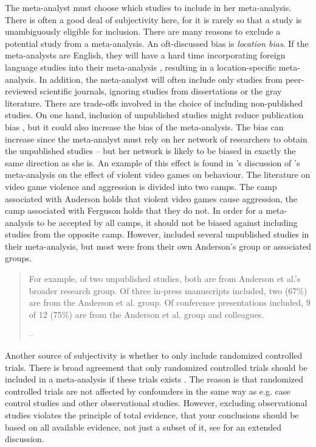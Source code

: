 The meta-analyst must choose which studies to include in her meta-analysis. There is often a good deal of subjectivity here, for it is rarely so that a study is unambiguously eligible for inclusion. There are many reasons to exclude a potential study from a meta-analysis. An oft-discussed bias is \emph{location bias}. If the meta-analysts are English, they will have a hard time incorporating foreign language studies into their meta-analysis , resulting in a location-specific meta-analysis. In addition, the meta-analyst will often include only studies from peer-reviewed scientific journals, ignoring studies from dissertations or the gray literature. There are trade-offs involved in the choice of including non-published studies. On one hand, inclusion of unpublished studies might reduce publication bias , but it could also increase the bias of the meta-analysis. The bias can increase since the meta-analyst must rely on her network of researchers to obtain the unpublished studies -- but her network is likely to be biased in exactly the same direction as she is. An example of this effect is found in \textcite{Ferguson2010-to}'s discussion of \textcite{Anderson2010-ki}'s meta-analysis on the effect of violent video games on behaviour. The literature on video game violence and aggression is divided into two camps. The camp associated with Anderson holds that violent video games cause aggression, the camp associated with Ferguson holds that they do not. In order for a meta-analysis to be accepted by all camps, it should not be biased against including studies from the opposite camp. However, \textcite{Anderson2010-ki} included several unpublished studies in their meta-analysis, but most were from their own Anderson's group or associated groups.
\begin{quote}
For example, of two unpublished studies, both are from Anderson et
al.'s broader research group. Of three in-press manuscripts
included, two (67\%) are from the Anderson et al. group. Of conference
presentations included, 9 of 12 (75\%) are from the Anderson et al.
group and colleagues. 
\begin{flushright}
-- \cite[p. 2]{Ferguson2010-to}
\par\end{flushright}
\end{quote}
Another source of subjectivity is whether to only include randomized controlled trials. There is broad agreement that only randomized controlled trials should be included in a meta-analysis if these trials exists . The reason is that randomized controlled trials are not affected by confounders in the same way as e.g. case control studies and other observational studies. However, excluding observational studies violates the principle of total evidence, that your conclusions should be based on all available evidence, not just a subset of it, see \textcite{Stegenga2011-zo} for an extended discussion.


